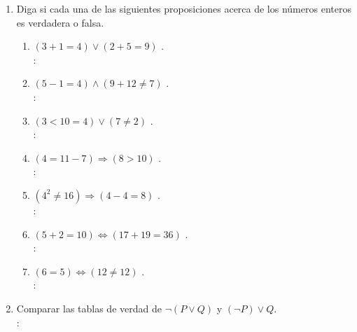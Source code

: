 \begin{enumerate}[label=0.1.\arabic*]
\begin{enumerate}[label=(\arabic*)]
	\end{enumerate}

	\item Diga si cada una de las siguientes proposiciones acerca de los números enteros es verdadera o falsa.
	\begin{enumerate}[label=(\arabic*)]
		\item $ (3+1 = 4) \vee (2+5 = 9) $ . \\
		\solucion: \\
		
		\item $ (5-1 = 4) \wedge (9+12 \neq 7) $ . \\
		\solucion: \\
		
		\item $ (3<10 = 4) \vee (7 \neq 2) $ . \\
		\solucion: \\
		
		\item $ (4 = 11-7) \Longrightarrow (8>10) $ . \\
		\solucion: \\
		
		\item $ (4^2 \neq 16) \Longrightarrow (4-4 = 8) $ . \\
		\solucion: \\
		
		\item $ (5+2 = 10) \Longleftrightarrow (17+19=36) $ . \\
		\solucion: \\
		
		\item $ (6 = 5) \Longleftrightarrow (12 \neq 12) $ . \\
		\solucion: \\
		
	\end{enumerate}

	\item Comparar las tablas de verdad de $ \neg (P \vee Q) $ y $ (\neg P) \vee Q $. \\
	\solucion: \\
	
\end{enumerate}


